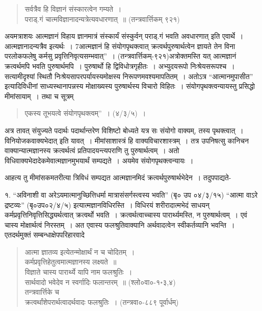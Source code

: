 {\begin{verse}
सर्वत्रैव हि विज्ञानं संस्कारत्वेन गम्यते~। \\
पराड्.गं चात्मविज्ञानादन्यत्रेत्यवधारणात्~॥ (तन्त्रवार्त्तिकम् ९२१)
\end{verse}

अयमत्राशयः  आत्मज्ञानं विहाय ज्ञानमात्रं संस्कार्यं संस्कुर्वन् पराड्.गं भवति अव\-धारणात् इति एवार्थे~। आत्मज्ञानादन्यत्रैव इत्यर्थः~। 7आत्मज्ञानं हि संयोगपृथक्त्वात् क्रत्वर्थ\-पुरुषार्थत्वेन ज्ञायते तेन विना परलोकफलेषु कर्मसु प्रवृत्तिनिवृत्यसम्भवात्”~। (तन्त्रवार्त्तिकम्-९२१)\break अत्रोक्तमस्ति यत् आत्मज्ञानं क्रत्वर्थमपि भवति पुरुषार्थमपि~। पुरुषार्थो हि द्विविधोत्र\break गृहीतः~। अभ्युदयरूपो निःश्रेयसरूपश्च~। सत्यामीदृश्यां स्थितौ निःश्रेयसापरपर्यायस्य\break मोक्षस्य निरूपणमवश्यमापतितम्~। अतोऽत्र “आत्मानमुपासीत” इत्यादिविधीनां साध्यस्था\-नापन्नस्य मोक्षाख्यस्य पुरुषार्थस्य विचारो विहितः~। संयोगपृथक्त्वन्यायस्तु प्रसिद्धो मीमांसा\-याम्~। तथा च सूत्रम्  

\begin{verse}
एकस्य तूभयत्वे संयोगपृथक्त्वम्”~। (४/३/५)~। 
\end{verse}
अत्र तावत् संयुज्यते पदार्थः पदार्थान्तरेण विशिष्टो बोध्यते यत्र सः संयोगो वाक्यम्, तस्य पृथक्त्वात्~। विनियोजकवाक्यभेदात् इति यावत्~। मीमांसाशास्त्रं हि वाक्यविचारशास्त्रम्~। तत्र उपनिषत्सु कानिचन वाक्यान्यात्मज्ञानस्य क्रत्वर्थत्वं प्रतिपादयन्त्यपराणि तु पुरुषार्थत्वम्~। अतो विधिवाक्यभेदादेकमेवात्मज्ञानमुभयार्थं सम्पद्यते~। अयमेव संयोगपृथक्त्वन्यायः~। 

आहत्य तु मीमांसकमतरीत्या त्रिविधं सम्पद्यत आत्मज्ञानमिदं क्रत्वर्थपुरुषार्थभेदेन~। तदुपपाद्यते-

१. “अविनाशी वा अरेऽयमात्मानुच्छित्तिधर्मा मात्रासंसर्गस्त्वस्य भवति” (बृ० उप ०४/३/१५) “आत्मा वाऽरे द्रष्टव्यः” (बृ०उप०२/४/५) इत्यात्मज्ञानविधिरस्ति~। विधिरयं शरीरादात्मभेदं साधयन् कर्मप्रवृत्तिनिवृत्तिसिद्ध्यर्थत्वात् क्रत्वर्थो भवति~। क्रत्वर्थत्वाच्चास्य पारार्थ्यमस्ति, न पुरुषार्थत्वम्~। एवं चास्य मोक्षार्थत्वं निरस्तम्~। अत एवास्य फलश्रुतिवाक्यानि अर्थवादत्वेन स्वीकर्तव्यानि भवन्ति~। एतदर्थमुक्तं सम्बन्धाक्षेपपरिहारवादे

\begin{verse}
आत्मा ज्ञातव्य इत्येतन्मोक्षार्थं न च चोदितम्~। \\
कर्मप्रवृत्तिहेतुत्वमात्मज्ञानस्य लक्ष्यते~॥ \\
विज्ञाते चास्य पारार्थ्ये यापि नाम फलश्रुतिः~। \\
सार्थवादो भवेदेव न स्वर्गादिः फलान्तरम्~॥ (श्लो०वा०-१॰३,४)\\
तन्त्रवार्त्तिके च\\
क्रत्वर्थांशेपरार्थत्वादर्थवादः फलश्रुतिः~। (तन्त्रवा०-८८९ पूर्वार्धम्)
\end{verse}

}
